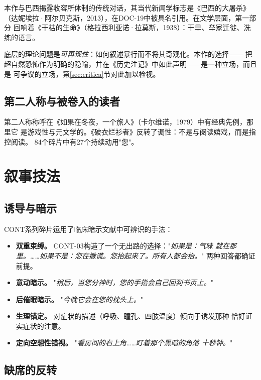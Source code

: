 \documentclass[11pt,a4paper]{article}
\begin{document}
本作与巴西揭露收容所体制的传统对话，其当代新闻学标志是《巴西的大屠杀》
（达妮埃拉·阿尔贝克斯，2013），在DOC-19中被具名引用。在文学层面，第一部分
回响着《干枯的生命》（格拉西利亚诺·拉莫斯，1938）：干旱、举家迁徙、洗练的语言。

底层的理论问题是\textit{可再现性}：如何叙述暴行而不将其奇观化。本作的选择——
把超自然恐怖作为明确的隐喻，并在《历史注记》中如此声明——是一种立场，而且是
可争议的立场，第\ref{sec:critica}节对此加以检视。

\subsection{第二人称与被卷入的读者}

第二人称称呼在《如果在冬夜，一个旅人》（卡尔维诺，1979）中有经典先例，那里它
是游戏性与元文学的。《破衣烂衫者》反转了调性：不是与阅读嬉戏，而是指控阅读。
84个碎片中有27个持续动用"您"。

\section{叙事技法}

\subsection{诱导与暗示}

CONT系列碎片运用了临床暗示文献中可辨识的手法：

\begin{itemize}
\item \textbf{双重束缚。} CONT-03构造了一个无出路的选择："\textit{如果是：气味
就在那里。……如果不是：您在撒谎。您抬起来了。所有人都会抬。}" 两种回答都确证
前提。

\item \textbf{意动暗示。} "\textit{稍后，当您分神时，您的手指会自己回到书页上。}"

\item \textbf{后催眠暗示。} "\textit{今晚它会在您的枕头上。}"

\item \textbf{生理锚定。} 对症状的描述（呼吸、瞳孔、四肢温度）倾向于诱发那种
恰好证实症状的注意。

\item \textbf{定向空想性错视。} "\textit{看房间的右上角……盯着那个黑暗的角落
十秒钟。}"
\end{itemize}

\subsection{缺席的反转}
\end{document}
